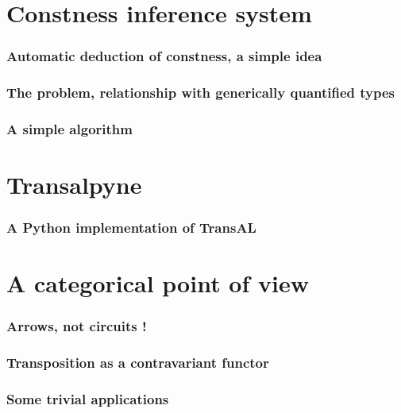 \documentclass[10pt]{beamer}
\begin{document}

\section{Constness inference system}

\begin{frame}
  \frametitle{Automatic deduction of constness, a simple idea}

\end{frame}


\begin{frame}
  \frametitle{The problem, relationship with generically quantified types}

\end{frame}


\begin{frame}
  \frametitle{A simple algorithm}

\end{frame}


\section{Transalpyne}

\begin{frame}
  \frametitle{A Python implementation of TransAL}

\end{frame}


\section{A categorical point of view}

\begin{frame}
  \frametitle{Arrows, not circuits !}

\end{frame}


\begin{frame}
  \frametitle{Transposition as a contravariant functor}

\end{frame}


\begin{frame}
  \frametitle{Some trivial applications}

\end{frame}
\end{document}
